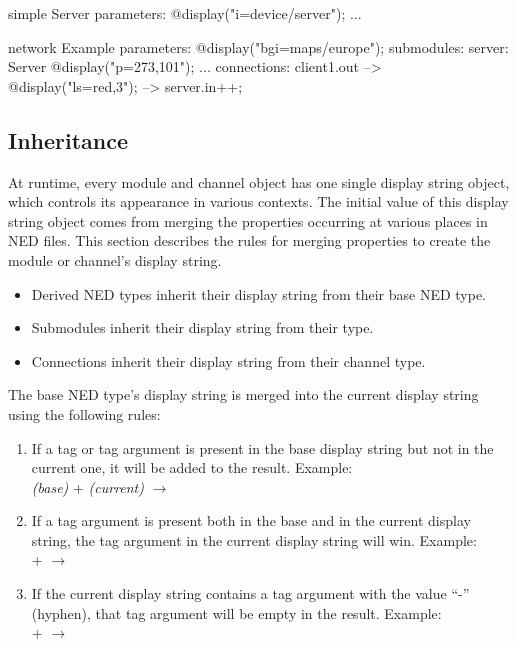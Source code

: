\begin{ned}
simple Server
{
    parameters:
        @display("i=device/server");
    ...
}

network Example
{
    parameters:
        @display("bgi=maps/europe");
    submodules:
        server: Server {
            @display("p=273,101");
        }
        ...
    connections:
        client1.out --> { @display("ls=red,3"); } --> server.in++;
}
\end{ned}


\subsection{Inheritance}
\label{sec:graphics:displaystring-inheritance}

At runtime, every module and channel object has one single display string object,
which controls its appearance in various contexts. The initial value of
this display string object comes from merging the 
properties occurring at various places in NED files.
This section describes the rules for merging  properties
to create the module or channel's display string.

\begin{itemize}
  \item Derived NED types inherit their display string from their base NED type.
  \item Submodules inherit their display string from their type.
  \item Connections inherit their display string from their channel type.
\end{itemize}

The base NED type's display string is merged into the current display string
using the following rules:

\begin{enumerate}
\item {} If a tag or tag argument is present in the base
    display string but not in the current one, it will be added to the
    result. Example: \\
     \textit{(base)} +  \textit{(current)} $\rightarrow$ 
\item {} If a tag argument is present both in the base
    and in the current display string, the tag argument in the current
    display string will win. Example: \\
     +  $\rightarrow$ 
\item {} If the current display string contains a tag argument
    with the value ``-'' (hyphen), that tag argument will be empty in
    the result. Example: \\
     +  $\rightarrow$ 
\end{enumerate}

